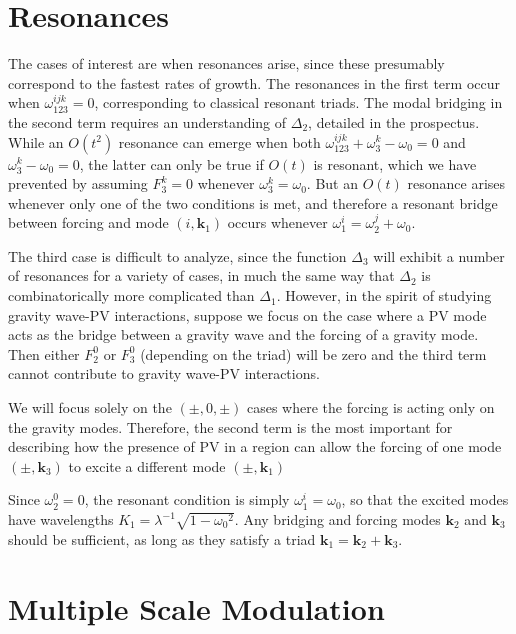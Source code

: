 \documentclass[letterpaper, 11pt]{article}
\begin{document}
\section{Resonances}

The cases of interest are when resonances arise, since these presumably correspond to the fastest rates of growth. The resonances in the first term occur when $\omega^{ijk}_{123} = 0$, corresponding to classical resonant triads. The modal bridging in the second term requires an understanding of $\Delta_2$, detailed in the prospectus. While an $O(t^2)$ resonance can emerge when both $\omega^{ijk}_{123} + \omega^k_3 - \omega_0 = 0$ and $\omega^k_3 - \omega_0 = 0$, the latter can only be true if $O(t)$ is resonant, which we have prevented by assuming $F^k_3 = 0$ whenever $\omega^k_3 = \omega_0$. But an $O(t)$ resonance arises whenever only one of the two conditions is met, and therefore a resonant bridge between forcing and mode $(i,\mathbf{k}_1)$ occurs whenever $\omega^i_1 = \omega^j_2 + \omega_0$.

The third case is difficult to analyze, since the function $\Delta_3$ will exhibit a number of resonances for a variety of cases, in much the same way that $\Delta_2$ is combinatorically more complicated than $\Delta_1$. However, in the spirit of studying gravity wave-PV interactions, suppose we focus on the case where a PV mode acts as the bridge between a gravity wave and the forcing of a gravity mode. Then either $F^0_2$ or $F^0_3$ (depending on the triad) will be zero and the third term cannot contribute to gravity wave-PV interactions.

We will focus solely on the $(\pm, 0, \pm)$ cases where the forcing is acting only on the gravity modes. Therefore, the second term is the most important for describing how the presence of PV in a region can allow the forcing of one mode $(\pm,\mathbf{k}_3)$ to excite a different mode $(\pm,\mathbf{k}_1)$

Since $\omega^0_2 = 0$, the resonant condition is simply $\omega^i_1 = \omega_0$, so that the excited modes have wavelengths $K_1 = \lambda^{-1} \sqrt{1 - {\omega_0}^2}$. Any bridging and forcing modes $\mathbf{k}_2$ and $\mathbf{k}_3$ should be sufficient, as long as they satisfy a triad $\mathbf{k}_1 = \mathbf{k}_2 + \mathbf{k}_3$.

\section{Multiple Scale Modulation}
\end{document}
